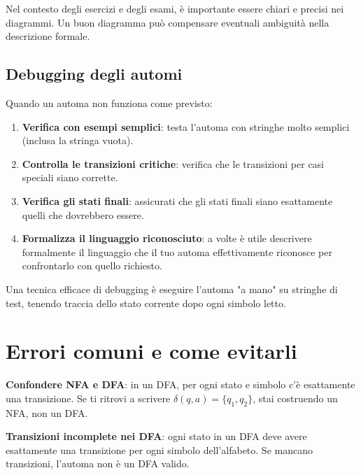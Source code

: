 \documentclass[12pt,a4paper]{article}
\begin{document}
\begin{suggerimento}
Nel contesto degli esercizi e degli esami, è importante essere chiari e precisi nei diagrammi. Un buon diagramma può compensare eventuali ambiguità nella descrizione formale.
\end{suggerimento}

\subsection{Debugging degli automi}

Quando un automa non funziona come previsto:
\begin{enumerate}
  \item \textbf{Verifica con esempi semplici}: testa l'automa con stringhe molto semplici (inclusa la stringa vuota).
  \item \textbf{Controlla le transizioni critiche}: verifica che le transizioni per casi speciali siano corrette.
  \item \textbf{Verifica gli stati finali}: assicurati che gli stati finali siano esattamente quelli che dovrebbero essere.
  \item \textbf{Formalizza il linguaggio riconosciuto}: a volte è utile descrivere formalmente il linguaggio che il tuo automa effettivamente riconosce per confrontarlo con quello richiesto.
\end{enumerate}

\begin{suggerimento}
Una tecnica efficace di debugging è eseguire l'automa "a mano" su stringhe di test, tenendo traccia dello stato corrente dopo ogni simbolo letto.
\end{suggerimento}

\section{Errori comuni e come evitarli}

\begin{errorecomune}
\textbf{Confondere NFA e DFA}: in un DFA, per ogni stato e simbolo c'è esattamente una transizione. Se ti ritrovi a scrivere $\delta(q, a) = \{q_1, q_2\}$, stai costruendo un NFA, non un DFA.
\end{errorecomune}

\begin{errorecomune}
\textbf{Transizioni incomplete nei DFA}: ogni stato in un DFA deve avere esattamente una transizione per ogni simbolo dell'alfabeto. Se mancano transizioni, l'automa non è un DFA valido.
\end{errorecomune}
\end{document}
